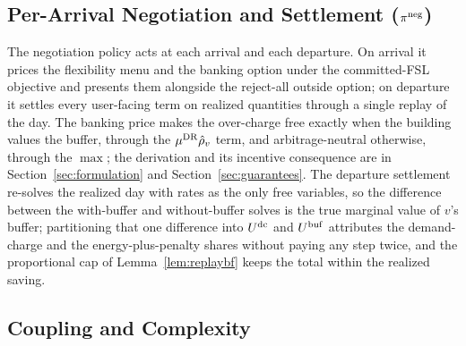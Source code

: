 

\subsection{Per-Arrival Negotiation and Settlement ($\pi^{\mathrm{neg}}$)}\label{sec:approach-neg}

The negotiation policy acts at each arrival and each departure. On arrival it prices the flexibility menu and the banking option under the committed-FSL objective and presents them alongside the reject-all outside option; on departure it settles every user-facing term on realized quantities through a single replay of the day.  The banking price makes the over-charge free exactly when the building values the buffer, through the $\mu^{\mathrm{DR}}\hat{\rho}_v$ term, and arbitrage-neutral otherwise, through the $\max$; the derivation and its incentive consequence are in Section~\ref{sec:formulation} and Section~\ref{sec:guarantees}. The departure settlement re-solves the realized day with rates as the only free variables, so the difference between the with-buffer and without-buffer solves is the true marginal value of $v$'s buffer; partitioning that one difference into $U^{\mathrm{dc}}$ and $U^{\mathrm{buf}}$ attributes the demand-charge and the energy-plus-penalty shares without paying any step twice, and the proportional cap of Lemma~\ref{lem:replaybf} keeps the total within the realized saving.

\subsection{Coupling and Complexity}\label{sec:approach-coupling}

